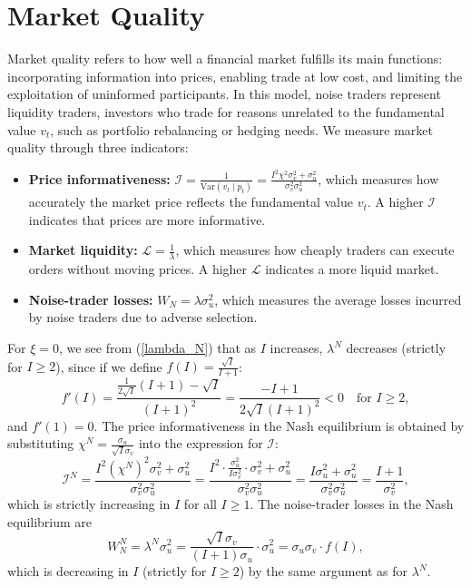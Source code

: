\documentclass[11pt]{article}
\begin{document}
\section{Market Quality}
Market quality refers to how well a financial market fulfills its main functions: 
incorporating information into prices, enabling trade at low cost, and limiting the 
exploitation of uninformed participants. In this model, noise traders represent 
liquidity traders, investors who trade for reasons unrelated to the fundamental 
value $v_t$, such as portfolio rebalancing or hedging needs. We measure market quality through three indicators:
\begin{itemize}
    \item \textbf{Price informativeness:} $\mathcal{I}=\frac{1}{\text{Var}(v_t\mid p_t)}=\frac{I^2\chi^2\sigma_v^2+\sigma_u^2}{\sigma_v^2\sigma_u^2}$, which measures how accurately the market price reflects the fundamental value $v_t$. A higher $\mathcal{I}$ indicates that prices are more informative.
    \item \textbf{Market liquidity:} $\mathcal{L}=\frac{1}{\lambda}$, which measures how cheaply traders can execute orders without moving prices. A higher $\mathcal{L}$ indicates a more liquid market.
    \item \textbf{Noise-trader losses:} $W_N=\lambda \sigma_u^2$, which measures the average losses incurred by noise traders due to adverse selection.
\end{itemize}

For $\xi=0$, we see from (\ref{lambda_N}) that as $I$ increases, $\lambda^N$ decreases 
(strictly for $I\ge 2$), since if we define $f(I)=\frac{\sqrt{I}}{I+1}$:
\[
f'(I)=\frac{\frac{1}{2\sqrt{I}}(I+1)-\sqrt{I}}{(I+1)^2}=\frac{-I+1}{2\sqrt{I}(I+1)^2}<0\quad \text{for }I\ge 2,
\]
and $f'(1)=0$.
The price informativeness in the Nash equilibrium is obtained by substituting 
$\chi^N = \frac{\sigma_u}{\sqrt{I}\sigma_v}$ into the expression for $\mathcal{I}$:
\[
\mathcal{I}^N=\frac{I^2(\chi^N)^2\sigma_v^2+\sigma_u^2}{\sigma_v^2\sigma_u^2}=
\frac{I^2\cdot\frac{\sigma_u^2}{I\sigma_v^2}\cdot\sigma_v^2+\sigma_u^2}{\sigma_v^2\sigma_u^2}=
\frac{I\sigma_u^2+\sigma_u^2}{\sigma_v^2\sigma_u^2}=\frac{I+1}{\sigma_v^2},
\]
which is strictly increasing in $I$ for all $I\ge 1$. The noise-trader losses in the
Nash equilibrium are
\[
W_N^N=\lambda^N\sigma_u^2=\frac{\sqrt{I}\sigma_v}{(I+1)\sigma_u}\cdot\sigma_u^2=
\sigma_u\sigma_v\cdot f(I),
\]
which is decreasing in $I$ (strictly for $I\ge 2$) by the same argument as for $\lambda^N$.
\end{document}
